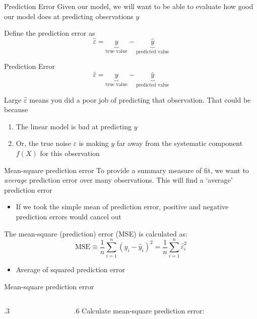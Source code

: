 \documentclass[aspectratio=169,t,11pt,table]{beamer}
\begin{document}
\begin{frame}{Prediction Error}
  Given our model, we will want to be able to evaluate how good our model does at predicting observations $y$

  \bigskip
  Define the \alert{prediction error} as 
  $$
    \hat{\varepsilon} = \underbrace{y}_{\text{true value}} - \underbrace{\hat{y}}_{\text{predicted value}}
  $$

\end{frame}

\begin{frame}{Prediction Error}
  $$
    \hat{\varepsilon} = \underbrace{y}_{\text{true value}} - \underbrace{\hat{y}}_{\text{predicted value}}
  $$

  \bigskip
  Large $\hat{\varepsilon}$ means you did a poor job of predicting that observation. That could be because
  \begin{enumerate}
    \item The linear model is bad at predicting $y$
    \item Or, the true noise $\varepsilon$ is making $y$ far away from the systematic component $f(X)$ for this observation
  \end{enumerate}
\end{frame}

\begin{frame}{Mean-square prediction error}
  To provide a summary measure of fit, we want to \emph{average} prediction error over many observations. This will find a `average' prediction error
  \begin{itemize}
    \item If we took the simple mean of prediction error, positive and negative prediction errors would cancel out
  \end{itemize}

  \pause
  \bigskip
  The \alert{mean-square (prediction) error} (MSE) is calculated as:
  \begin{equation}\label{eq:mspe}
    \text{MSE} \equiv \frac{1}{n} \sum_{i=1}^n \left( y_i - \hat{y}_i \right)^2 = \frac{1}{n} \sum_{i=1}^n \hat{\varepsilon}_i^2
  \end{equation}
  \begin{itemize}
    \item Average of squared prediction error
  \end{itemize}
\end{frame}

\begin{frame}{Mean-square prediction error}
  \begin{columns}[T]
    \begin{column}{.3\textwidth}\vspace*{-\bigskipamount}
      
    \end{column}
    \hfill
    \begin{column}{.6\textwidth}
      Calculate mean-square prediction error:

    \end{column}
  \end{columns}
\end{frame}
\end{document}
